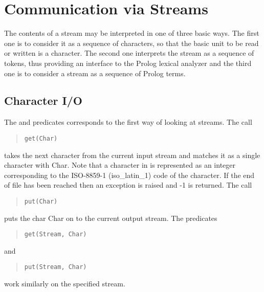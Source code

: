 \section{Communication via Streams}
The contents of a stream may be interpreted in one of
three basic ways.
The first one is to
consider it as a sequence of characters, so that the basic unit to
be read or written is a character. The second one interprets
the stream as a sequence of tokens, thus providing an interface
to the Prolog lexical analyzer and the third one is to consider a stream as
a sequence of Prolog terms.

\subsection{Character I/O}
The %
and
%
predicates corresponds to the first way
of looking at streams. The call
\begin{quote}
\begin{verbatim}
get(Char)
\end{verbatim}
\end{quote}
takes the next character from
the current input stream and matches it as a single character with Char.
Note that a character in {\eclipse} is represented as an integer corresponding
to the ISO-8859-1 (iso_latin_1) code of the character.
If the end of file has been reached then an exception is raised and -1
is returned.
The call
\begin{quote}
\begin{verbatim}
put(Char)
\end{verbatim}
\end{quote}
puts the char Char on to the current output stream.
The predicates
\begin{quote}
\begin{verbatim}
get(Stream, Char)
\end{verbatim}
\end{quote}
 and
\begin{quote}
\begin{verbatim}
put(Stream, Char)
\end{verbatim}
\end{quote}
work similarly on the specified
stream.

